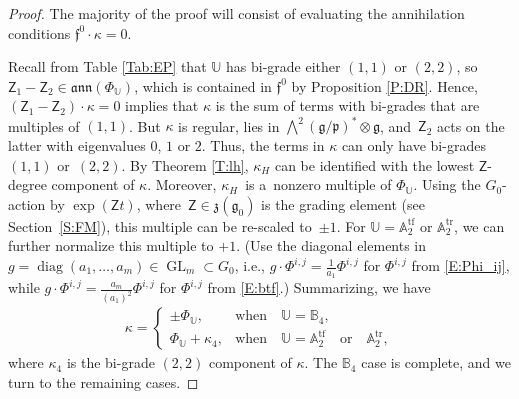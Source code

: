 \documentclass[10pt,a4paper]{amsart}
\newcommand\tensor{\otimes}
\DeclareMathOperator{\tf}{tf}
\DeclareMathOperator{\tr}{tr}
\DeclareMathOperator{\diag}{diag}
\newcommand\GL{\operatorname{GL}}
\newcommand{\g}{\mathfrak{g}}
\newcommand\fann{\mathfrak{ann}}
\newcommand\ff{\mathfrak{f}}
\newcommand\fp{\mathfrak{p}}
\newcommand\fz {\mathfrak{z}}
\newcommand\bbU{\mathbb{U}}
\newcommand\bbA{\mathbb{A}}
\newcommand\bbB{\mathbb{B}}
\newcommand\sfZ{\mathsf{Z}}
\numberwithin{equation}{section}
\begin{document}
\begin{proof}
The majority of the proof will consist of evaluating the annihilation conditions $\ff^0 \cdot \kappa = 0$.

Recall from Table \ref{Tab:EP} that $\bbU$ has bi-grade either $(1,1)$ or $(2,2)$, so $\sfZ_1 - \sfZ_2 \in \fann(\Phi_\bbU)$, which is contained in $\ff^0$ by Proposition \ref{P:DR}. Hence, $(\sfZ_1 - \sfZ_2) \cdot \kappa = 0$ implies that $\kappa$ is the sum of terms with bi-grades that are multiples of $(1,1)$. But $\kappa$ is regular, lies in $\bigwedge^2(\g/\fp)^\ast \tensor \g$, and~$\sfZ_2$ acts on the latter with eigenvalues $0$, $1$ or $2$. Thus, the terms in $\kappa$ can only have bi-grades~$(1,1)$ or~$(2,2)$.
By Theorem \ref{T:lh}, $\kappa_H$ can be identified with the lowest $\sfZ$-degree component of $\kappa$. Moreover, $\kappa_H$~is a~nonzero multiple of $\Phi_\bbU$. Using the $G_0$-action by $\exp(\sfZ t)$, where~$\sfZ \in \fz(\g_0)$ is the grading element (see Section~\ref{S:FM}), this multiple can be re-scaled to~$\pm 1$. For $\bbU = \bbA_2^{\tf}$ or $\bbA_2^{\tr}$, we can further normalize this multiple to $+1$. (Use the diagonal elements in~${g = \diag(a_1,\dots ,a_m) \in \GL_m \subset G_0}$, i.e., $g \cdot \Phi^{i,j} = \frac{1}{a_1} \Phi^{i,j}$ for $\Phi^{i,j}$ from \eqref{E:Phi_ij}, while
${g \cdot \Phi^{i,j} = \frac{a_m}{(a_1)^2} \Phi^{i,j}}$ for $\Phi^{i,j}$ from \eqref{E:btf}.)
Summarizing, we have
\begin{align*}%
\kappa =
\begin{cases}
\pm \Phi_\bbU, & \text{when} \quad \bbU = \bbB_4,\\
\Phi_\bbU + \kappa_4, & \text{when} \quad \bbU = \bbA_2^{\tf} \quad \text{or}\quad \bbA_2^{\tr},
\end{cases}
\end{align*}
where $\kappa_4$ is the bi-grade $(2,2)$ component of $\kappa$. The $\bbB_4$ case is complete, and we turn to the remaining cases.
	

\end{proof}
\end{document}
